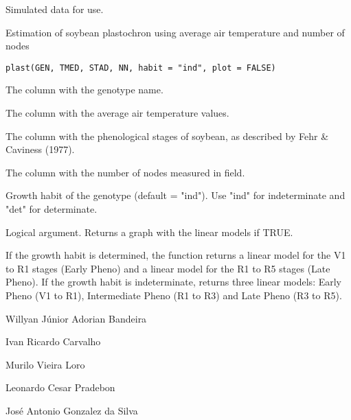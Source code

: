 \documentclass[a4paper]{book}
\begin{document}
%
\begin{Source}
Simulated data for use.
\end{Source}
%
\begin{Description}
Estimation of soybean plastochron using average air temperature and number of
nodes
\end{Description}
%
\begin{Usage}
\begin{verbatim}
plast(GEN, TMED, STAD, NN, habit = "ind", plot = FALSE)
\end{verbatim}
\end{Usage}
%
\begin{Arguments}
\begin{ldescription}
\item[\code{GEN}] The column with the genotype name.

\item[\code{TMED}] The column with the average air temperature values.

\item[\code{STAD}] The column with the phenological stages of soybean, as described by
Fehr \& Caviness (1977).

\item[\code{NN}] The column with the number of nodes measured in field.

\item[\code{habit}] Growth habit of the genotype (default = "ind"). Use "ind" for
indeterminate and "det" for determinate.

\item[\code{plot}] Logical argument. Returns a graph with the linear models if TRUE.
\end{ldescription}
\end{Arguments}
%
\begin{Value}
If the growth habit is determined, the function returns a linear model
for the V1 to R1 stages (Early Pheno) and a linear model for the R1 to R5
stages (Late Pheno). If the growth habit is indeterminate, returns three linear
models: Early Pheno (V1 to R1), Intermediate Pheno (R1 to R3) and Late Pheno
(R3 to R5).
\end{Value}
%
\begin{Author}
Willyan Júnior Adorian Bandeira

Ivan Ricardo Carvalho

Murilo Vieira Loro

Leonardo Cesar Pradebon

José Antonio Gonzalez da Silva
\end{Author}
\end{document}
